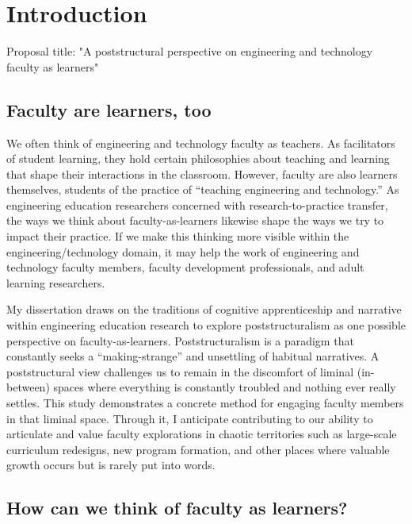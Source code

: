 

\chapter{Introduction}

Proposal title: "A poststructural perspective on engineering and technology faculty as learners"


\section{Faculty are learners, too}

We often think of engineering and technology faculty as teachers. As facilitators of student learning, they hold certain philosophies about teaching and learning that shape their interactions in the classroom. However, faculty are also learners themselves, students of the practice of “teaching engineering and technology.” As engineering education researchers concerned with research-to-practice transfer, the ways we think about faculty-as-learners likewise shape the ways we try to impact their practice. If we make this thinking more visible within the engineering/technology domain, it may help the work of engineering and technology faculty members, faculty development professionals, and adult learning researchers.

My dissertation draws on the traditions of cognitive apprenticeship and narrative within engineering education research to explore poststructuralism as one possible perspective on faculty-as-learners. Poststructuralism is a paradigm that constantly seeks a “making-strange” and unsettling of habitual narratives. A poststructural view challenges us to remain in the discomfort of liminal (in-between) spaces where everything is constantly troubled and nothing ever really settles. This study demonstrates a concrete method for engaging faculty members in that liminal space. Through it, I anticipate contributing to our ability to articulate and value faculty explorations in chaotic territories such as large-scale curriculum redesigns, new program formation, and other places where valuable growth occurs but is rarely put into words.

\section{How can we think of faculty as learners?}

